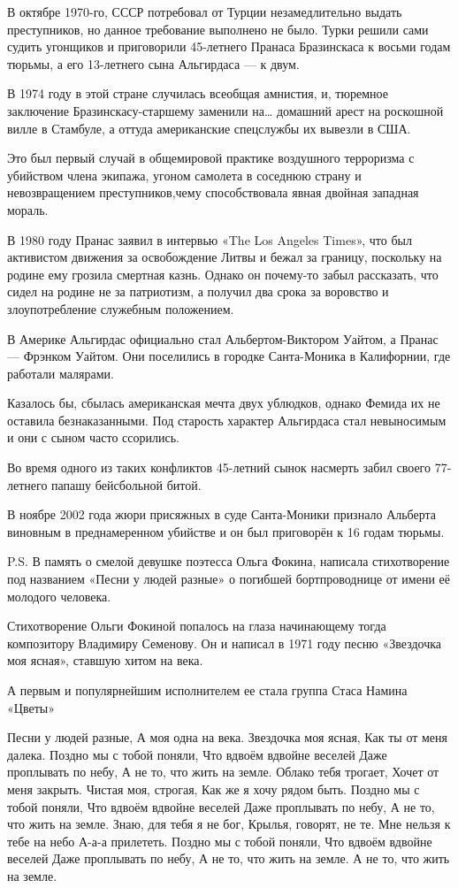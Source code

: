В октябре 1970-го, СССР потребовал от Турции незамедлительно выдать
преступников, но данное требование выполнено не было. Турки решили сами судить
угонщиков и приговорили 45-летнего Пранаса Бразинскаса к восьми годам тюрьмы, а
его 13-летнего сына Альгирдаса --- к двум.

В 1974 году в этой стране случилась всеобщая амнистия, и, тюремное заключение
Бразинскасу-старшему заменили на… домашний арест на роскошной вилле в Стамбуле,
а оттуда американские спецслужбы их вывезли в США.

Это был первый случай в общемировой практике воздушного терроризма с убийством
члена экипажа, угоном самолета в соседнюю страну и невозвращением
преступников,чему способствовала явная двойная западная мораль.

В 1980 году Пранас заявил в интервью «The Los Angeles Times», что был
активистом движения за освобождение Литвы и бежал за границу, поскольку на
родине ему грозила смертная казнь. Однако он почему-то забыл рассказать, что
сидел на родине не за патриотизм, а получил два срока за воровство и
злоупотребление служебным положением.

В Америке Альгирдас официально стал Альбертом-Виктором Уайтом, а Пранас —
Фрэнком Уайтом. Они поселились в городке Санта-Моника в Калифорнии, где
работали малярами.

Казалось бы, сбылась американская мечта двух ублюдков, однако Фемида их не
оставила безнаказанными. Под старость характер Альгирдаса стал невыносимым и
они с сыном часто ссорились.

Во время одного из таких конфликтов 45-летний сынок насмерть забил своего
77-летнего папашу бейсбольной битой.

В ноябре 2002 года жюри присяжных в суде Санта-Моники признало Альберта
виновным в преднамеренном убийстве и он был приговорён к 16 годам тюрьмы.

P.S. В память о смелой девушке поэтесса Ольга Фокина, написала стихотворение
под названием «Песни у людей разные» о погибшей бортпроводнице от имени её
молодого человека.


Стихотворение Ольги Фокиной попалось на глаза начинающему тогда композитору
Владимиру Семенову. Он и написал в 1971 году песню «Звездочка моя ясная»,
ставшую хитом на века.

А первым и популярнейшим исполнителем ее стала группа Стаса Намина «Цветы»

Песни у людей разные,
А моя одна на века.
Звездочка моя ясная,
Как ты от меня далека.
Поздно мы с тобой поняли,
Что вдвоём вдвойне веселей
Даже проплывать по небу,
А не то, что жить на земле.
Облако тебя трогает,
Хочет от меня закрыть.
Чистая моя, строгая,
Как же я хочу рядом быть.
Поздно мы с тобой поняли,
Что вдвоём вдвойне веселей
Даже проплывать по небу,
А не то, что жить на земле.
Знаю, для тебя я не бог,
Крылья, говорят, не те.
Мне нельзя к тебе на небо
А-а-а прилететь.
Поздно мы с тобой поняли,
Что вдвоём вдвойне веселей
Даже проплывать по небу,
А не то, что жить на земле.
А не то, что жить на земле.
